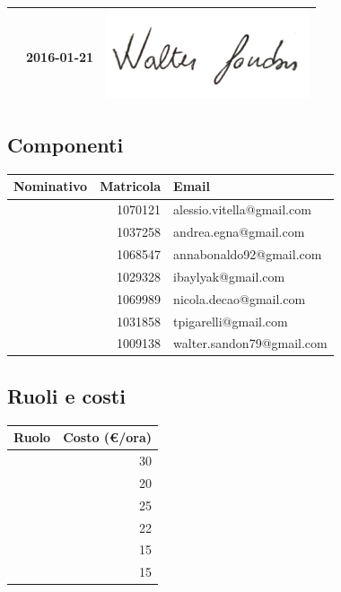\documentclass[12pt,a4paper]{article}
\begin{document}
\begin{table}[H]
\begin{center}
\begin{tabular}{l l l}
			\WS{} & 2016-01-21 & \includegraphics[width=6cm]{../img/firmaSandon.png} \\
			\bottomrule
		\end{tabular}
	\end{center}
\end{table}

\subsection{Componenti}

\begin{table}[H]
	\begin{center}
		\begin{tabular}{l r l}
			\toprule
            \textbf{Nominativo}	& \textbf{Matricola} & \textbf{Email} \\ \midrule
			\midrule
			\AVI{} & 1070121 & alessio.vitella@gmail.com \\ \midrule
			\AVE{} & 1037258 & andrea.egna@gmail.com \\ \midrule
			\AB{} & 1068547 & annabonaldo92@gmail.com \\ \midrule
			\IB{} & 1029328 & ibaylyak@gmail.com \\ \midrule
			\NDC{} & 1069989 & nicola.decao@gmail.com \\ \midrule
			\TP{}  & 1031858 & tpigarelli@gmail.com \\ \midrule
			\WS{} & 1009138 & walter.sandon79@gmail.com \\
			\bottomrule
		\end{tabular}
	\end{center}
\end{table}

\subsection{Ruoli e costi}\label{ruoli e costi}

\begin{table}[H]
	\begin{center}
		\begin{tabular}{l r}
			\toprule
            \textbf{Ruolo}	& \textbf{Costo (\euro/ora)} \\ \midrule
			\midrule
            \RE{} & 30 \\ \midrule
            \AM{} & 20 \\ \midrule
            \AN{} & 25 \\ \midrule
            \PG{} & 22 \\ \midrule
            \PR{} & 15 \\ \midrule
            \VR{} & 15 \\
			\bottomrule
		\end{tabular}
	\end{center}
\end{table}

\newpage
\printglossary[title={Glossario}]
\end{document}
